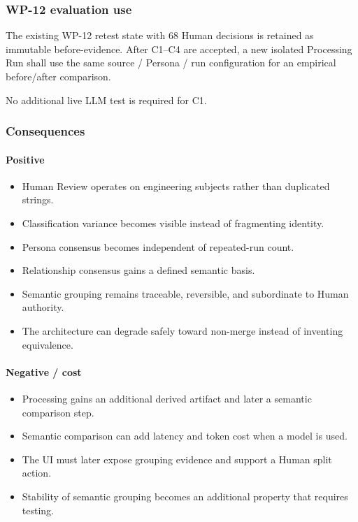 \hypertarget{wp-12-evaluation-use}{%
\subsubsection{WP-12 evaluation use}\label{wp-12-evaluation-use}}

The existing WP-12 retest state with 68 Human decisions is retained as immutable before-evidence. After C1--C4 are accepted, a new isolated Processing Run shall use the same source / Persona / run configuration for an empirical before/after comparison.

No additional live LLM test is required for C1.

\hypertarget{consequences-10}{%
\subsubsection{Consequences}\label{consequences-10}}

\hypertarget{positive-3}{%
\paragraph{Positive}\label{positive-3}}

\begin{itemize}
\tightlist
\item
  Human Review operates on engineering subjects rather than duplicated strings.
\item
  Classification variance becomes visible instead of fragmenting identity.
\item
  Persona consensus becomes independent of repeated-run count.
\item
  Relationship consensus gains a defined semantic basis.
\item
  Semantic grouping remains traceable, reversible, and subordinate to Human authority.
\item
  The architecture can degrade safely toward non-merge instead of inventing equivalence.
\end{itemize}

\hypertarget{negative--cost}{%
\paragraph{Negative / cost}\label{negative--cost}}

\begin{itemize}
\tightlist
\item
  Processing gains an additional derived artifact and later a semantic comparison step.
\item
  Semantic comparison can add latency and token cost when a model is used.
\item
  The UI must later expose grouping evidence and support a Human split action.
\item
  Stability of semantic grouping becomes an additional property that requires testing.
\end{itemize}

